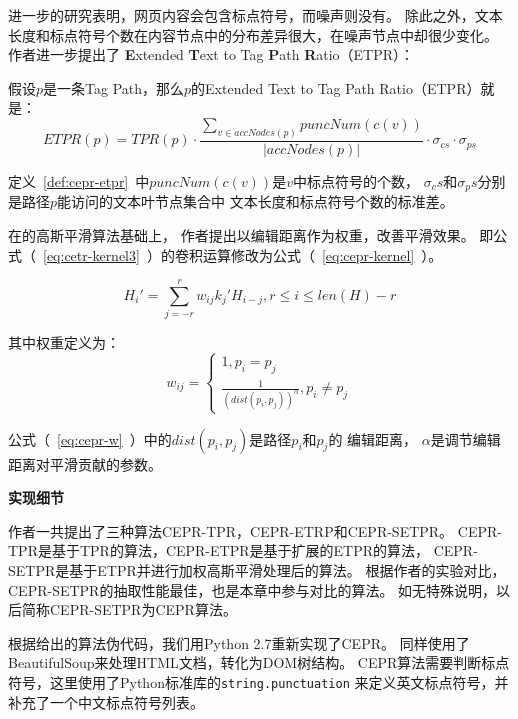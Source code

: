 进一步的研究表明，网页内容会包含标点符号，而噪声则没有。
除此之外，文本长度和标点符号个数在内容节点中的分布差异很大，在噪声节点中却很少变化。
作者进一步提出了
\textbf{E}xtended \textbf{T}ext to Tag \textbf{P}ath \textbf{R}atio（ETPR）：

\begin{definition}
\label{def:cepr-etpr}
假设$p$是一条Tag Path，那么$p$的Extended Text to Tag Path Ratio（ETPR）就是：
\begin{equation}
ETPR(p) = TPR(p) \cdot 
\frac{\sum_{v \in accNodes(p)}puncNum(c(v))}{\vert accNodes(p) \vert}
\cdot \sigma_{cs} \cdot \sigma_{ps}
\end{equation}
\end{definition}

定义~\ref{def:cepr-etpr}~中$puncNum(c(v))$是$v$中标点符号的个数，
$\sigma_cs$和$\sigma_ps$分别是路径$p$能访问的文本叶节点集合中
文本长度和标点符号个数的标准差。

在\cite{weninger2010cetr}的高斯平滑算法基础上，
作者提出以编辑距离作为权重，改善平滑效果。
即公式（~\ref{eq:cetr-kernel3}~）的卷积运算修改为公式（~\ref{eq:cepr-kernel}~）。

\begin{equation}
\label{eq:cepr-kernel}
H_i' = \sum_{j=-r}^{r} w_{ij} k_j' H_{i-j}, r \leq i \leq len(H)-r
\end{equation}

其中权重定义为：
\begin{equation}
\label{eq:cepr-w}
w_{ij} = 
\left\{\begin{matrix}
1, p_i = p_j \\ 
\frac{1}{(dist(p_i, p_j))^\alpha}, p_i \neq p_j
\end{matrix}\right.
\end{equation}

公式（~\ref{eq:cepr-w}~）中的$dist(p_i, p_j)$是路径$p_i$和$p_j$的
编辑距离，
$\alpha$是调节编辑距离对平滑贡献的参数。

\textbf{实现细节}

作者一共提出了三种算法CEPR-TPR，CEPR-ETRP和CEPR-SETPR。
CEPR-TPR是基于TPR的算法，CEPR-ETPR是基于扩展的ETPR的算法，
CEPR-SETPR是基于ETPR并进行加权高斯平滑处理后的算法。
根据作者的实验对比，CEPR-SETPR的抽取性能最佳，也是本章中参与对比的算法。
如无特殊说明，以后简称CEPR-SETPR为CEPR算法。

根据\cite{wu2013web}给出的算法伪代码，我们用Python 2.7重新实现了CEPR。
同样使用了BeautifulSoup来处理HTML文档，转化为DOM树结构。
CEPR算法需要判断标点符号，这里使用了Python标准库的\texttt{string.punctuation}
来定义英文标点符号，并补充了一个中文标点符号列表。

